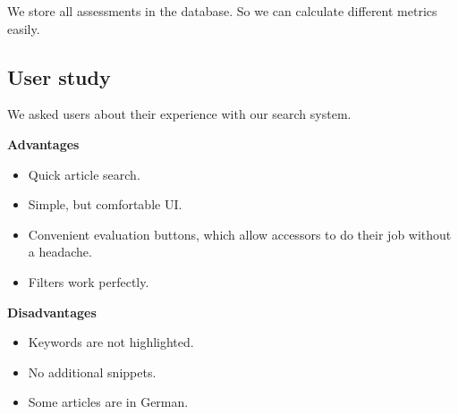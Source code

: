 We store all assessments in the database. So we can calculate different metrics easily.

\subsection{User study}
We asked users about their experience with our search system.

\textbf{Advantages}
\begin{itemize}
	\item Quick article search.
	\item Simple, but comfortable UI.
	\item Convenient evaluation buttons, which allow accessors to do their job without a headache.
	\item Filters work perfectly.
\end{itemize}

\textbf{Disadvantages}
\begin{itemize}
	\item Keywords are not highlighted.
	\item No additional snippets.
	\item Some articles are in German.
\end{itemize}	
 

